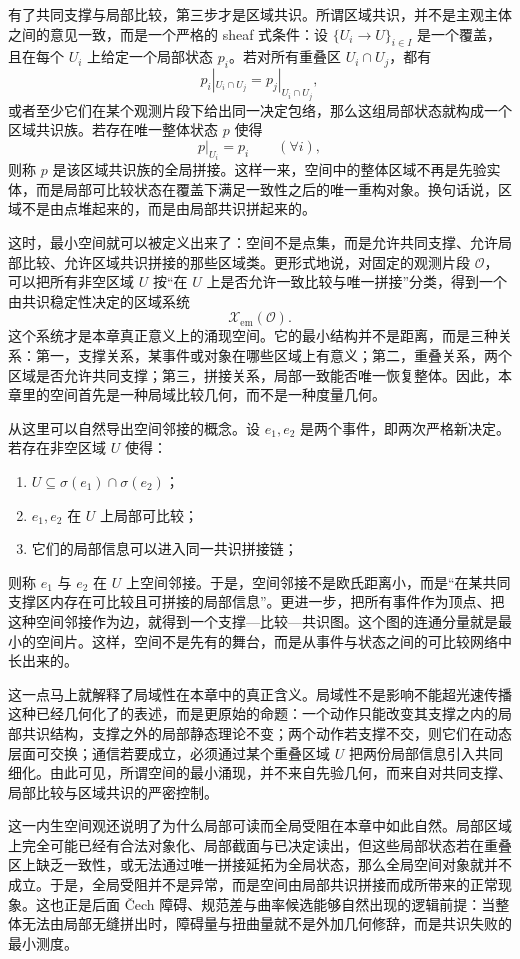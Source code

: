 有了共同支撑与局部比较，第三步才是区域共识。所谓区域共识，并不是主观主体之间的意见一致，而是一个严格的 sheaf 式条件：设 \(\{U_i\to U\}_{i\in I}\) 是一个覆盖，且在每个 \(U_i\) 上给定一个局部状态 \(p_i\)。若对所有重叠区 \(U_i\cap U_j\)，都有
\[
p_i|_{U_i\cap U_j}=p_j|_{U_i\cap U_j},
\]
或者至少它们在某个观测片段下给出同一决定包络，那么这组局部状态就构成一个区域共识族。若存在唯一整体状态 \(p\) 使得
\[
p|_{U_i}=p_i\qquad(\forall i),
\]
则称 \(p\) 是该区域共识族的全局拼接。这样一来，空间中的整体区域不再是先验实体，而是局部可比较状态在覆盖下满足一致性之后的唯一重构对象。换句话说，区域不是由点堆起来的，而是由局部共识拼起来的。

这时，最小空间就可以被定义出来了：空间不是点集，而是允许共同支撑、允许局部比较、允许区域共识拼接的那些区域类。更形式地说，对固定的观测片段 \(\mathcal O\)，可以把所有非空区域 \(U\) 按“在 \(U\) 上是否允许一致比较与唯一拼接”分类，得到一个由共识稳定性决定的区域系统
\[
\mathcal X_{\mathrm{em}}(\mathcal O).
\]
这个系统才是本章真正意义上的涌现空间。它的最小结构并不是距离，而是三种关系：第一，支撑关系，某事件或对象在哪些区域上有意义；第二，重叠关系，两个区域是否允许共同支撑；第三，拼接关系，局部一致能否唯一恢复整体。因此，本章里的空间首先是一种局域比较几何，而不是一种度量几何。

从这里可以自然导出空间邻接的概念。设 \(e_1,e_2\) 是两个事件，即两次严格新决定。若存在非空区域 \(U\) 使得：
\begin{enumerate}
  \item \(U\subseteq \sigma(e_1)\cap \sigma(e_2)\)；
  \item \(e_1,e_2\) 在 \(U\) 上局部可比较；
  \item 它们的局部信息可以进入同一共识拼接链；
\end{enumerate}
则称 \(e_1\) 与 \(e_2\) 在 \(U\) 上空间邻接。于是，空间邻接不是欧氏距离小，而是“在某共同支撑区内存在可比较且可拼接的局部信息”。更进一步，把所有事件作为顶点、把这种空间邻接作为边，就得到一个支撑—比较—共识图。这个图的连通分量就是最小的空间片。这样，空间不是先有的舞台，而是从事件与状态之间的可比较网络中长出来的。

这一点马上就解释了局域性在本章中的真正含义。局域性不是影响不能超光速传播这种已经几何化了的表述，而是更原始的命题：一个动作只能改变其支撑之内的局部共识结构，支撑之外的局部静态理论不变；两个动作若支撑不交，则它们在动态层面可交换；通信若要成立，必须通过某个重叠区域 \(U\) 把两份局部信息引入共同细化。由此可见，所谓空间的最小涌现，并不来自先验几何，而来自对共同支撑、局部比较与区域共识的严密控制。

这一内生空间观还说明了为什么局部可读而全局受阻在本章中如此自然。局部区域上完全可能已经有合法对象化、局部截面与已决定读出，但这些局部状态若在重叠区上缺乏一致性，或无法通过唯一拼接延拓为全局状态，那么全局空间对象就并不成立。于是，全局受阻并不是异常，而是空间由局部共识拼接而成所带来的正常现象。这也正是后面 Čech 障碍、规范差与曲率候选能够自然出现的逻辑前提：当整体无法由局部无缝拼出时，障碍量与扭曲量就不是外加几何修辞，而是共识失败的最小测度。

